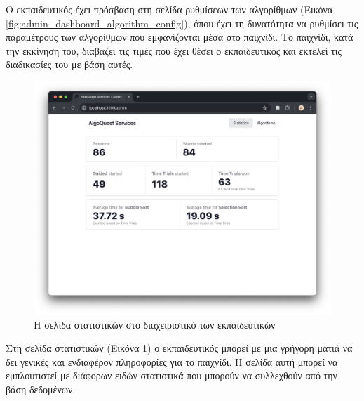 Ο εκπαιδευτικός έχει πρόσβαση στη σελίδα ρυθμίσεων των αλγορίθμων (Εικόνα \ref{fig:admin_dashboard_algorithm_config}), όπου έχει τη δυνατότητα να ρυθμίσει τις παραμέτρους των αλγορίθμων που εμφανίζονται μέσα στο παιχνίδι. Το παιχνίδι, κατά την εκκίνηση του, διαβάζει τις τιμές που έχει θέσει ο εκπαιδευτικός και εκτελεί τις διαδικασίες του με βάση αυτές.

\begin{figure}[H]
    \centering
    \includegraphics[width=0.7\linewidth]{sections/4/1/images/admin_dashboard_statistics}
    \caption{Η σελίδα στατιστικών στο διαχειριστικό των εκπαιδευτικών}
    \label{fig:admin_dashboard_statistics}
\end{figure}

Στη σελίδα στατιστικών (Εικόνα \ref{fig:admin_dashboard_statistics}) ο εκπαιδευτικός μπορεί με μια γρήγορη ματιά να δει γενικές και ενδιαφέρον πληροφορίες για το παιχνίδι. Η σελίδα αυτή μπορεί να εμπλουτιστεί με διάφορων ειδών στατιστικά που μπορούν να συλλεχθούν από την βάση δεδομένων.
